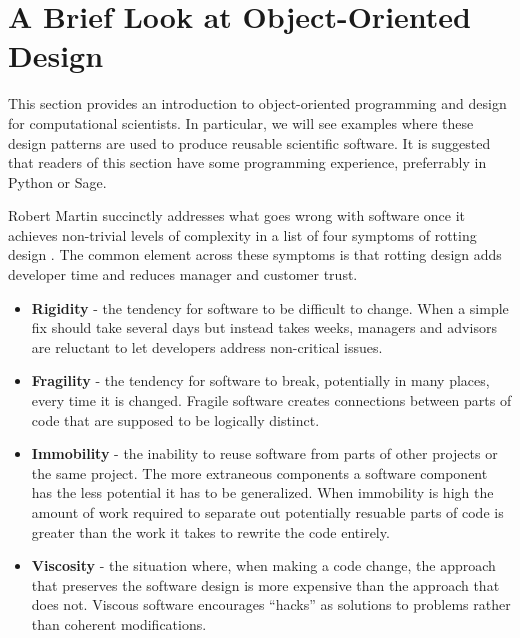 \section{A Brief Look at Object-Oriented Design}\label{sec:object-oriented-design}

This section provides an introduction to object-oriented programming and design
for computational scientists. In particular, we will see examples where these
design patterns are used to produce reusable scientific software. It is
suggested that readers of this section have some programming experience,
preferrably in Python or Sage. %

Robert Martin succinctly addresses what goes wrong with software once it
achieves non-trivial levels of complexity in a list of four symptoms of rotting
design \cite{martin2000design}. The common element across these symptoms is that
rotting design adds developer time and reduces manager and customer trust.
\begin{itemize}
\item {\bf Rigidity} - the tendency for software to be difficult to change. When
  a simple fix should take several days but instead takes weeks, managers and
  advisors are reluctant to let developers address non-critical issues.
\item {\bf Fragility} - the tendency for software to break, potentially in many
  places, every time it is changed. Fragile software creates connections between
  parts of code that are supposed to be logically distinct.
\item {\bf Immobility} - the inability to reuse software from parts of other
  projects or the same project. The more extraneous components a software
  component has the less potential it has to be generalized.  When 
  immobility is high the amount of work required to separate out potentially
  resuable parts of code is greater than the work it takes to rewrite the code
  entirely. %
\item {\bf Viscosity} - the situation where, when making a code change, the
  approach that preserves the software design is more expensive than the
  approach that does not. Viscous software encourages ``hacks'' as solutions to
  problems rather than coherent modifications.
\end{itemize}

